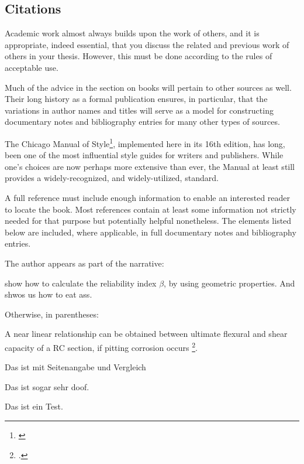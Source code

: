 \subsection*{Citations}
\label{sec:citations}

Academic work almost always builds upon the work of others, and it is appropriate, indeed essential, that you discuss the related and previous work of others in your thesis. However, this must be done according to the rules of acceptable use.

Much of the advice in the section on books will pertain to other sources as well. Their long history as a formal publication ensures, in particular, that the variations in author names and titles will serve as a model for constructing documentary notes and bibliography entries for many other types of sources.

The Chicago Manual of Style\footnote{\cite{chicago2010}}, implemented here in its 16th edition, has long, been one of the most influential style guides for writers and publishers. While one’s choices are now perhaps more extensive than ever, the Manual at least still provides a widely-recognized, and widely-utilized, standard.

A full reference must include enough information to enable an interested reader to locate the book. Most references contain at least some information not strictly needed for that purpose but potentially helpful nonetheless. The elements listed below are included, where applicable, in full documentary notes and bibliography entries.

The author appears as part of the narrative:
\begin{IMleftrightskip}
 \cite[p.100]{Nowak2000} show how to calculate the reliability index $\beta$, by using geometric properties.
 And \cite{chicago2010} shwos us how to eat ass.
\end{IMleftrightskip}

Otherwise, in parentheses:
\begin{IMleftrightskip}
A near linear relationship can be obtained between ultimate flexural and shear capacity of a RC section, if pitting corrosion occurs \footcite{Stewart2009}.


\cite[vlg.][17]{Nowak2000} Das ist mit Seitenangabe und Vergleich

\cite{Nowak2000} Das ist sogar sehr doof. 

\autocite{Nowak2000} Das ist ein Test.
\end{IMleftrightskip}

%

